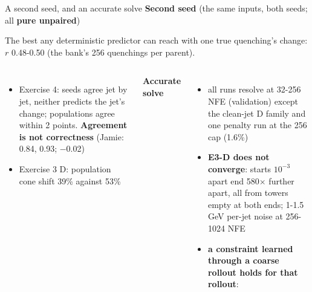 \documentclass[aspectratio=169,10pt]{beamer}
\newcommand{\suplab}[2]{{\setlength{\fboxsep}{1.2pt}\colorbox{#1!14}{\scriptsize\color{#1!80!black}\textbf{#2}}}}
\newcommand{\UP}{\suplab{cUP}{pure unpaired}}
\newcommand{\snote}[1]{{\scriptsize\color{ink2}#1\par}}
\newcommand{\fittab}[2]{\resizebox{#1}{!}{}}
\begin{document}
\begin{frame}{A second seed, and an accurate solve}
\scriptsize
\textbf{Second seed} (the same inputs, both seeds; all \UP)

\vspace{0.2em}
\fittab{0.62\textwidth}{tables/seeds.tex}

\vspace{0.1em}
\snote{The best any deterministic predictor can reach with one true quenching's change: $r$ 0.48-0.50
(the bank's 256 quenchings per parent).}
\vspace{0.2em}
\begin{columns}[T]
\scriptsize
\begin{itemize}\setlength\itemsep{0.15em}
\item Exercise 4: seeds agree jet by jet, neither predicts the jet's change; populations agree within
  2 points. \textbf{Agreement is not correctness} (Jamie: 0.84, 0.93; $-$0.02)
\item Exercise 3 D: population cone shift 39\% against 53\%
\end{itemize}
\scriptsize
\textbf{Accurate solve}
\begin{itemize}\setlength\itemsep{0.15em}
\item all runs resolve at 32-256 NFE (validation) except the clean-jet D family and one penalty run
  at the 256 cap (1.6\%)
\item \textbf{E3-D does not converge}: starts $10^{-3}$ apart end 580$\times$ further apart, all from
  towers empty at both ends; 1-1.5 GeV per-jet noise at 256-1024 NFE
\item \textbf{a constraint learned through a coarse rollout holds for that rollout}:
\end{itemize}
\vspace{0.1em}
\fittab{0.78\linewidth}{tables/transfer.tex}
\end{columns}
\end{frame}
\end{document}
